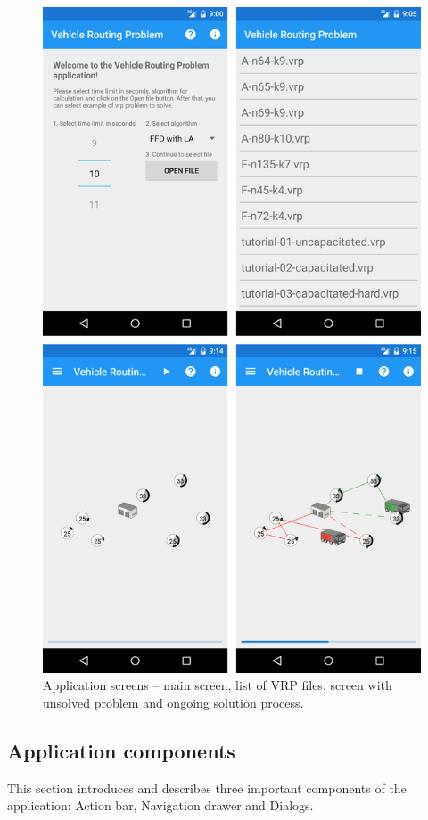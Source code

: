 \begin{figure}[h!]
    \centering
    \includegraphics[scale=0.15]{fig/screens.png}
    \caption{Application screens -- main screen, list of VRP files, screen with unsolved problem and ongoing solution
    process.}
    \label{ApplicationScreensFigure}
\end{figure}

\subsection{Application components}
This section introduces and describes three important components of the application: Action bar, Navigation drawer and
Dialogs.

